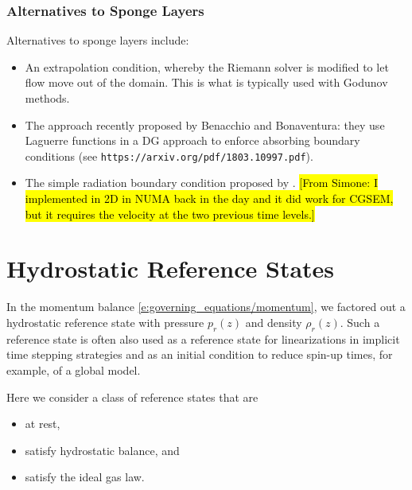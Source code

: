 \documentclass{report}
\begin{document}
\subsection{Alternatives to Sponge Layers}

Alternatives to sponge layers include:
 \begin{itemize}
    \item An extrapolation condition, whereby the Riemann solver is modified to let flow move out of the domain. This is what is typically used with Godunov methods. 
    \item The approach recently proposed by Benacchio and Bonaventura: they use Laguerre functions in a DG approach to enforce absorbing boundary conditions (see \texttt{https://arxiv.org/pdf/1803.10997.pdf}).
    \item The simple radiation boundary condition proposed by \cite{orlanski1979}. \hl{[From Simone: I implemented in 2D in NUMA back in the day and it did work for CGSEM, but it requires the velocity at the two previous time levels.]}
\end{itemize}
    
    
\chapter{Hydrostatic Reference States}\label{c:reference_state}

In the momentum balance \eqref{e:governing_equations/momentum}, we factored out a hydrostatic reference state with pressure $p_r(z)$ and density $\rho_r(z)$. Such a reference state is often also used as a reference state for linearizations in implicit time stepping strategies and as an initial condition to reduce spin-up times, for example, of a global model. 

Here we consider a class of reference states that are
\begin{itemize}
    \item at rest,
    \item satisfy hydrostatic balance, and
    \item satisfy the ideal gas law.
\end{itemize}
\end{document}
